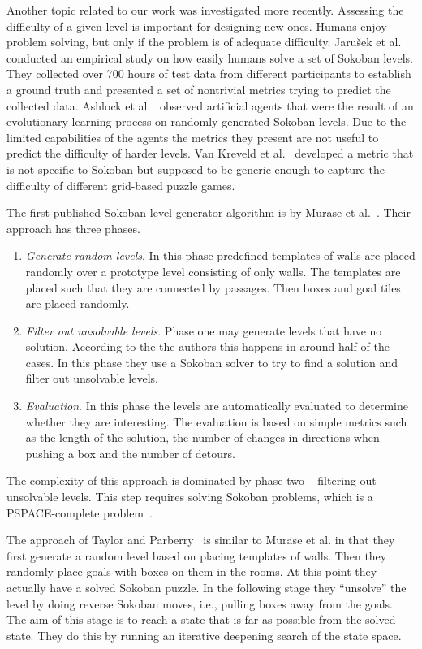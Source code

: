 \documentclass[runningheads]{llncs}
\begin{document}
Another topic related to our work was investigated more recently. Assessing the
difficulty of a given level is important for designing new ones.
Humans enjoy problem solving, but only if the problem is of adequate difficulty.
Jaru{\v s}ek et al.~\cite{jaruvsek2010human}
conducted an empirical study on how easily humans solve a set of Sokoban levels. They collected over 700 hours of test data from different participants to establish a ground truth and presented a set of nontrivial metrics trying to predict the collected data.
Ashlock et al.~\cite{ashlockEvolutionAutomaticAssessment2010}
observed artificial agents that were the result of an evolutionary learning process on randomly generated Sokoban levels. Due to the limited capabilities of the agents the metrics they present are not useful to predict the difficulty of harder levels.
Van Kreveld et al.~\cite{vankreveldAutomatedPuzzleDifficulty2015}
developed a metric that is not specific to Sokoban but supposed to be generic enough to capture the difficulty of different grid-based puzzle games.

The first published Sokoban level generator algorithm is by Murase et al.~\cite{murase1996automatic}.
Their approach has three phases.
\begin{enumerate}
\item \emph{Generate random levels}. In this phase predefined templates of walls are placed randomly
over a prototype level consisting of only walls.
The templates are placed such that they are connected by passages.
Then boxes and goal tiles are placed randomly.
\item \emph{Filter out unsolvable levels}. Phase one may generate levels that have no solution. According to the the authors this happens in around half of the cases. In this phase they use a Sokoban solver to try to find a solution and filter out unsolvable levels.
\item \emph{Evaluation}. In this phase the levels are automatically evaluated to determine whether
they are interesting. The evaluation is based on simple metrics such as the length of the solution, the number of changes in directions when pushing a box and the number of detours.
\end{enumerate}

The complexity of this approach is dominated by phase two -- filtering out unsolvable levels. This
step requires solving Sokoban problems, which is a PSPACE-complete problem~\cite{culberson1997sokoban}.

The approach of Taylor and Parberry~\cite{taylor2011procedural} is similar to Murase et al.
in that they first generate a random level based on placing templates of walls. Then they
randomly place goals with boxes on them in the rooms. At this point they
actually have a solved Sokoban
puzzle. In the following stage they ``unsolve'' the level by doing reverse Sokoban moves, i.e.,
pulling boxes away from the goals. The aim of this stage is to reach a state that is far as
possible from the solved state. They do this by running an iterative deepening search of the
state space.
\end{document}
